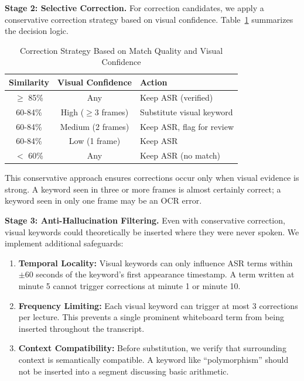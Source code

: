 \textbf{Stage 2: Selective Correction.} For correction candidates, we apply a conservative correction strategy based on visual confidence. Table~\ref{tab:correction_strategy} summarizes the decision logic.

\begin{table}[h]
\centering
\caption{Correction Strategy Based on Match Quality and Visual Confidence}
\label{tab:correction_strategy}
\begin{tabular}{|c|c|l|}
\hline
\textbf{Similarity} & \textbf{Visual Confidence} & \textbf{Action} \\
\hline
$\geq$ 85\% & Any & Keep ASR (verified) \\
\hline
60-84\% & High ($\geq$3 frames) & Substitute visual keyword \\
\hline
60-84\% & Medium (2 frames) & Keep ASR, flag for review \\
\hline
60-84\% & Low (1 frame) & Keep ASR \\
\hline
$<$ 60\% & Any & Keep ASR (no match) \\
\hline
\end{tabular}
\end{table}

This conservative approach ensures corrections occur only when visual evidence is strong. A keyword seen in three or more frames is almost certainly correct; a keyword seen in only one frame may be an OCR error.

\textbf{Stage 3: Anti-Hallucination Filtering.} Even with conservative correction, visual keywords could theoretically be inserted where they were never spoken. We implement additional safeguards:

\begin{enumerate}
    \item \textbf{Temporal Locality:} Visual keywords can only influence ASR terms within $\pm$60 seconds of the keyword's first appearance timestamp. A term written at minute 5 cannot trigger corrections at minute 1 or minute 10.
    
    \item \textbf{Frequency Limiting:} Each visual keyword can trigger at most 3 corrections per lecture. This prevents a single prominent whiteboard term from being inserted throughout the transcript.
    
    \item \textbf{Context Compatibility:} Before substitution, we verify that surrounding context is semantically compatible. A keyword like ``polymorphism'' should not be inserted into a segment discussing basic arithmetic.
\end{enumerate}

